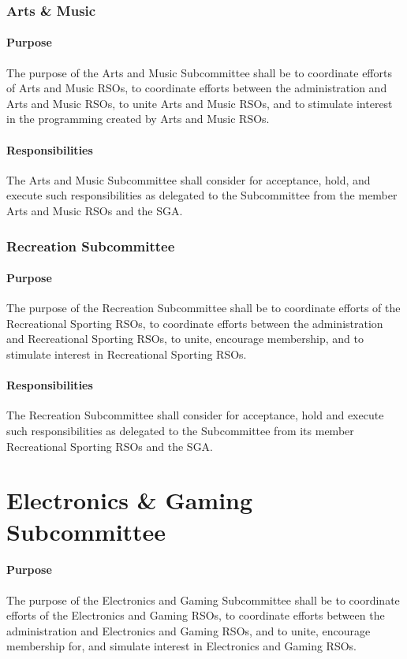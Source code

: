 \documentclass[12pt]{scrreprt}
\begin{document}
\subsubsection{Arts \& Music}

\paragraph{Purpose}
The purpose of the Arts and Music Subcommittee shall be to coordinate efforts
of Arts and Music RSOs, to coordinate efforts between the administration and Arts and
Music RSOs, to unite Arts and Music RSOs, and to stimulate interest in the programming
created by Arts and Music RSOs.

\paragraph{Responsibilities}
​The Arts and Music Subcommittee shall consider for acceptance, hold,
and execute such responsibilities as delegated to the Subcommittee from the member Arts
and Music RSOs and the SGA.

\subsubsection{Recreation Subcommittee}

\paragraph{Purpose}
​The purpose of the Recreation Subcommittee shall be to coordinate efforts of
the Recreational Sporting RSOs, to coordinate efforts between the administration and
Recreational Sporting RSOs, to unite, encourage membership, and to stimulate interest in
Recreational Sporting RSOs.

\paragraph{Responsibilities}
​The Recreation Subcommittee shall consider for acceptance, hold and
execute such responsibilities as delegated to the Subcommittee from its member
Recreational Sporting RSOs and the SGA.

\section{Electronics & Gaming Subcommittee}
\paragraph{Purpose}
​The purpose of the Electronics and Gaming Subcommittee shall be to
coordinate efforts of the Electronics and Gaming RSOs, to coordinate efforts between the
administration and Electronics and Gaming RSOs, and to unite, encourage membership for,
and simulate interest in Electronics and Gaming RSOs.
\end{document}
